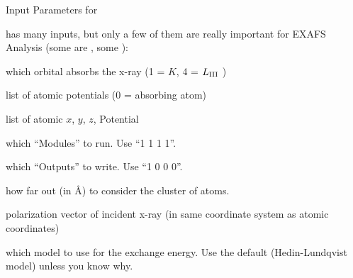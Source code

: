 \begin{slide}{Input Parameters for {}}

  {\feff} has many  inputs, but only a few of them are really
  important for EXAFS Analysis (some are {}, some {}):


  \begin{description}[POTENTIALSXX]
  \item[{\Red{\texttt{HOLE}}}]   which orbital absorbs the x-ray (1 = $K$, 4
    = $L_{\rm III}$ )

  \item[{\Red{\texttt{POTENTIALS}}}]   list of atomic potentials (0 = absorbing atom)

  \item[{\Red{\texttt{ATOMS}}}]   list of atomic $x$, $y$, $z$, Potential

  \item[{\Red{\texttt{CONTROL}}}]   which ``Modules'' to run.  Use  ``1 1 1 1''.

  \item[{\Red{\texttt{PRINT}}}]   which ``Outputs'' to write. Use  ``1 0 0 0''.


    \pause
  \item[{\Blue{\texttt{RMAX}}}]   how far out (in {\AA}) to consider the
    cluster of atoms.

  \item[{\Blue{\texttt{POLARIZATION}}}]   polarization vector of incident
    x-ray (in same coordinate system as atomic coordinates)

  \item[{\Blue{\texttt{EXCHANGE}}}]   which model to use for the exchange energy.
    Use the default (Hedin-Lundqvist model) unless you know why.

  \end{description}

\end{slide}


